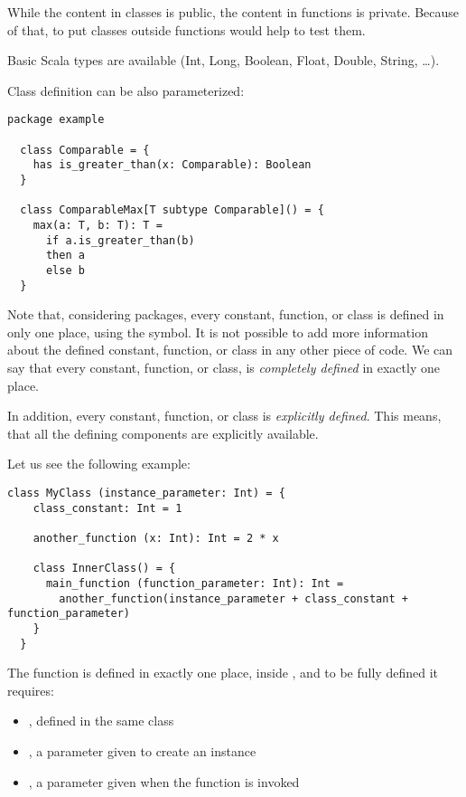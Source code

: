 While the content in classes is public, the content in functions is private.
Because of that, to put classes outside functions would help to test them.

Basic Scala types are available (Int, Long, Boolean, Float, Double, String, \ldots).

Class definition can be also parameterized:
\begin{lstlisting}[label={lst:exampleParameterizedClass}]
  package example

  class Comparable = {
    has is_greater_than(x: Comparable): Boolean
  }

  class ComparableMax[T subtype Comparable]() = {
    max(a: T, b: T): T =
      if a.is_greater_than(b)
      then a
      else b
  }
\end{lstlisting}

Note that, considering packages, every constant, function, or class is defined in only one place, using the \sdef symbol.
It is not possible to add more information about the defined constant, function, or class in any other piece of code.
We can say that every constant, function, or class, is \emph{completely defined} in exactly one place.

In addition, every constant, function, or class is \emph{explicitly defined}.
This means, that all the defining components are explicitly available.

Let us see the following example:
\begin{lstlisting}[label={lst:exampleExplicitDefinition}]
  class MyClass (instance_parameter: Int) = {
    class_constant: Int = 1

    another_function (x: Int): Int = 2 * x

    class InnerClass() = {
      main_function (function_parameter: Int): Int =
        another_function(instance_parameter + class_constant + function_parameter)
    }
  }
\end{lstlisting}

The function  is defined in exactly one place, inside , and to be fully defined it requires:
\begin{itemize}
    \item {}, defined in the same class
    \item {}, a parameter given to create an instance
    \item {}, a parameter given when the function is invoked
\end{itemize}

